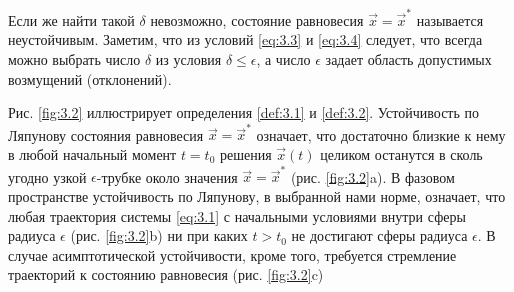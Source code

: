 
Если же найти такой $\delta$ невозможно, состояние равновесия $\vec x = \vec x^*$ называется неустойчивым. Заметим, что из условий \eqref{eq:3.3} и \eqref{eq:3.4} следует, что всегда можно выбрать число $\delta$ из условия $\delta \leq \epsilon $, а число $\epsilon$ задает область допустимых возмущений (отклонений).

Рис. \ref{fig:3.2} иллюстрирует определения \ref{def:3.1} и \ref{def:3.2}. Устойчивость по Ляпунову состояния равновесия $\vec x = \vec x^*$ означает, что достаточно близкие к нему в любой начальный момент $t=t_0$ решения $\vec x(t)$ целиком останутся в сколь угодно узкой $\epsilon$-трубке около значения $\vec x = \vec x^*$ (рис. \ref{fig:3.2}a). В фазовом пространстве устойчивость по Ляпунову, в выбранной нами норме, означает, что любая траектория системы \eqref{eq:3.1} с начальными условиями внутри сферы радиуса $\epsilon$ (рис. \ref{fig:3.2}b) ни при каких $t>t_0$ не достигают сферы радиуса $\epsilon$. В случае асимптотической устойчивости, кроме того, требуется стремление траекторий к состоянию равновесия (рис. \ref{fig:3.2}c) 

